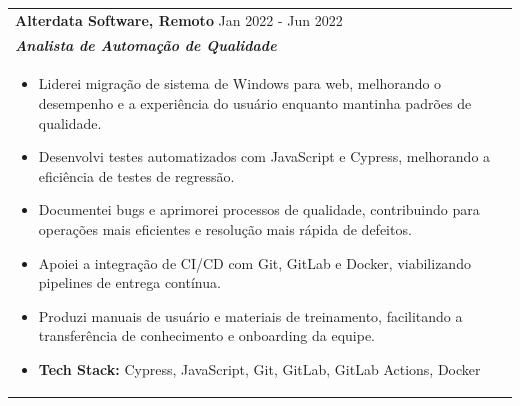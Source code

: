 \documentclass[a4paper,8pt]{article}
\begin{document}
\begin{tabularx}{\linewidth}{ @{}l r@{} }
\textbf{{Alterdata Software, Remoto}} \hfill \color[HTML]{371e77} Jan 2022 - Jun 2022 \\[4pt]
\color[HTML]{371e77}\textbf{\textit{Analista de Automa\c{c}\~ao de Qualidade}}\ \hfill \color[HTML]{4B28A4} \\[5pt]
\begin{minipage}[t]{\linewidth}
    \begin{itemize}[nosep,after=\strut, leftmargin=2em, itemsep=2pt]
        \item Liderei migra\c{c}\~ao de sistema de Windows para web, melhorando o desempenho e a experi\^encia do usu\'ario enquanto mantinha padr\~oes de qualidade.
        \item Desenvolvi testes automatizados com JavaScript e Cypress, melhorando a efici\^encia de testes de regress\~ao.
        \item Documentei bugs e aprimorei processos de qualidade, contribuindo para opera\c{c}\~oes mais eficientes e resolu\c{c}\~ao mais r\'apida de defeitos.
        \item Apoiei a integra\c{c}\~ao de CI/CD com Git, GitLab e Docker, viabilizando pipelines de entrega cont\'inua.
        \item Produzi manuais de usu\'ario e materiais de treinamento, facilitando a transfer\^encia de conhecimento e onboarding da equipe.
        \item \textbf{Tech Stack:} Cypress, JavaScript, Git, GitLab, GitLab Actions, Docker
    \end{itemize}
\end{minipage}
\end{tabularx}
\end{document}
